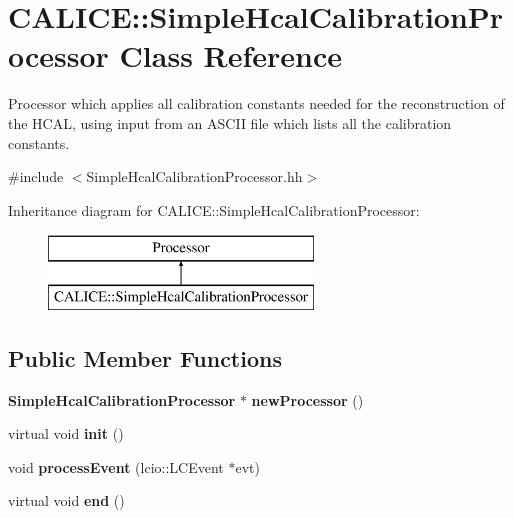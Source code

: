 \section{C\-A\-L\-I\-C\-E\-:\-:Simple\-Hcal\-Calibration\-Processor Class Reference}
\label{classCALICE_1_1SimpleHcalCalibrationProcessor}


Processor which applies all calibration constants needed for the reconstruction of the H\-C\-A\-L, using input from an A\-S\-C\-I\-I file which lists all the calibration constants.  




{\ttfamily \#include $<$Simple\-Hcal\-Calibration\-Processor.\-hh$>$}

Inheritance diagram for C\-A\-L\-I\-C\-E\-:\-:Simple\-Hcal\-Calibration\-Processor\-:\begin{figure}[H]
\begin{center}
\leavevmode
\includegraphics[height=2.000000cm]{classCALICE_1_1SimpleHcalCalibrationProcessor}
\end{center}
\end{figure}
\subsection*{Public Member Functions}
\begin{DoxyCompactItemize}
\item 
{\bf Simple\-Hcal\-Calibration\-Processor} $\ast$ {\bfseries new\-Processor} ()\label{classCALICE_1_1SimpleHcalCalibrationProcessor_a1682beed2fe00351f65858cbaf7ac0fa}

\item 
virtual void {\bfseries init} ()\label{classCALICE_1_1SimpleHcalCalibrationProcessor_a2f394a288da039ef7209457ec028b858}

\item 
void {\bfseries process\-Event} (lcio\-::\-L\-C\-Event $\ast$evt)\label{classCALICE_1_1SimpleHcalCalibrationProcessor_a91d98edae41d16b962f5acf420d0c898}

\item 
virtual void {\bfseries end} ()\label{classCALICE_1_1SimpleHcalCalibrationProcessor_ada5724ec6026eb8289567ccbcfdd0ed8}

\end{DoxyCompactItemize}
